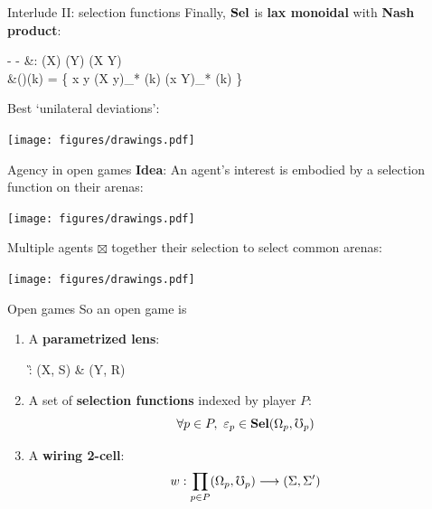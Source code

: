 \begin{frame}{Interlude II: selection functions}
	Finally, $\mathbf{Sel}$ is \textbf{lax monoidal} with \textbf{Nash product}:

	\begin{eqalign*}
		- \boxtimes - &: \Sel(X) \times \Sel(Y) \to \Sel(X \otimes Y)\\
		&(\varepsilon \boxtimes \eta)(k) = \{ x \otimes y \in (X \otimes y)_* \varepsilon(k) \cap (x \otimes Y)_* \eta(k) \}
	\end{eqalign*}

	Best `unilateral deviations':

	\begin{center}
		\texttt{[image: figures/drawings.pdf]}
	\end{center}
\end{frame}

\begin{frame}{Agency in open games}
	\textbf{Idea}: An agent's interest is embodied by a selection function on their arenas:

	\vspace{-3ex}
	\begin{center}
		\texttt{[image: figures/drawings.pdf]}
	\end{center}

	Multiple agents $\boxtimes$ together their selection to select common arenas:

	\begin{center}
		\texttt{[image: figures/drawings.pdf]}
	\end{center}
\end{frame}

\begin{frame}{Open games}
	So an open game is

	\begin{definition}
		\begin{enumerate}
			\item A \textbf{parametrized lens}:
			\begin{diagram*}
				\G : (X, S)  \& (Y, R)
			\end{diagram*}
			\item A set of \textbf{selection functions} indexed by player $P$:
			\begin{equation*}
				\forall p \in P,\ \varepsilon_p \in \mathbf{Sel}(\Omega_p, \mho_p)
			\end{equation*}
			\item A \textbf{wiring 2-cell}:
			\begin{equation*}
				w : \prod_{p \in P} (\Omega_p, \mho_p) \longrightarrow (\Sigma, \Sigma')
			\end{equation*}
		\end{enumerate}
	\end{definition}
\end{frame}

